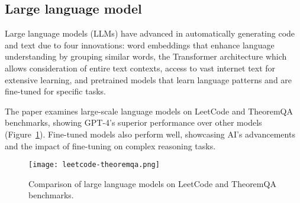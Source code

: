 \documentclass{article}
\begin{document}
\subsection{Large language model}

Large language models (LLMs) have advanced in automatically generating code and text due to four innovations: word embeddings 
that enhance language understanding by grouping similar words, the Transformer architecture which allows consideration of 
entire text contexts, access to vast internet text for extensive learning, and pretrained models that learn language patterns 
and are fine-tuned for specific tasks.\cite{sarkar2022like}
    

The paper \cite{yuan2024advancing} examines large-scale language models on 
LeetCode and TheoremQA benchmarks, showing GPT-4's superior performance over other models (Figure~\ref{fig:llm_comparison})\cite{yuan2024advancing}. 
Fine-tuned models also perform well, showcasing AI's advancements and the impact of fine-tuning on complex reasoning tasks.

\begin{figure}[htbp]
    \centering
    \texttt{[image: leetcode-theoremqa.png]} 
    \caption{Comparison of large language models on LeetCode and TheoremQA benchmarks.}
    \label{fig:llm_comparison}
\end{figure}
    
\end{document}
